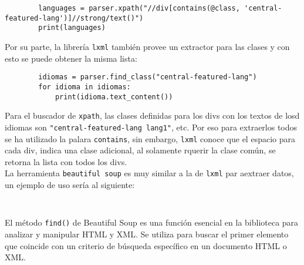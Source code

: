     \begin{verbatim}
        languages = parser.xpath("//div[contains(@class, 'central-featured-lang')]//strong/text()")
        print(languages)
    \end{verbatim}
 
    Por su parte, la librería \texttt{lxml} también provee un extractor para las clases y con esto se puede obtener la misma lista:

    \begin{verbatim}
        idiomas = parser.find_class("central-featured-lang")
        for idioma in idiomas:
            print(idioma.text_content())
    \end{verbatim}
    
    Para el buscador de \texttt{xpath}, las clases definidas para los divs con los textos de losd idiomas son \texttt{"central-featured-lang lang1"}, etc. Por eso para extraerlos todos se ha utilizado la palara \texttt{contains}, sin embargo, \texttt{lxml} conoce que el espacio para cada div, indica una clase adicional, al solamente rquerir la clase común, se retorna la lista con todos los divs. \\

    La herramienta \texttt{beautiful soup} es muy similar a la de \texttt{lxml} par aextraer datos, un ejemplo de uso sería al siguiente:

    \begin{verbatim}
        
    \end{verbatim}

    El método \texttt{find()} de Beautiful Soup es una función esencial en la biblioteca para analizar y manipular HTML y XML. Se utiliza para buscar el primer elemento que coincide con un criterio de búsqueda específico en un documento HTML o XML.

